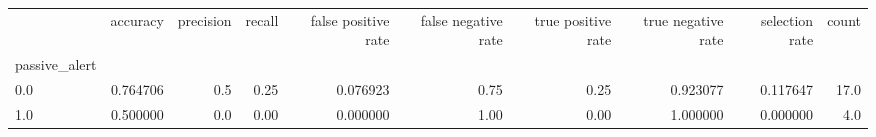 \begin{tabular}{lrrrrrrrrr}
\toprule
{} &  accuracy &  precision &  recall &  false positive rate &  false negative rate &  true positive rate &  true negative rate &  selection rate &  count \\
passive\_alert &           &            &         &                      &                      &                     &                     &                 &        \\
\midrule
0.0           &  0.764706 &        0.5 &    0.25 &             0.076923 &                 0.75 &                0.25 &            0.923077 &        0.117647 &   17.0 \\
1.0           &  0.500000 &        0.0 &    0.00 &             0.000000 &                 1.00 &                0.00 &            1.000000 &        0.000000 &    4.0 \\
\bottomrule
\end{tabular}
